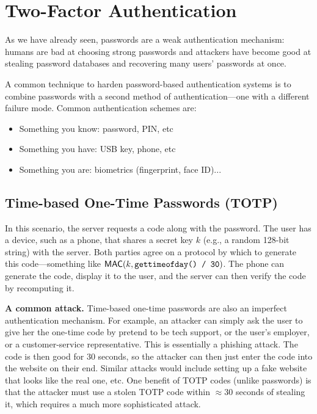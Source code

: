 \section{Two-Factor Authentication}
As we have already seen, passwords are a weak authentication
mechanism: humans are bad at choosing strong passwords and 
attackers have become good at stealing password databases
and recovering many users' passwords at once.

A common technique to harden password-based authentication systems
is to combine passwords with a second method of 
authentication---one with a different failure mode. 
Common authentication schemes are:

\begin{itemize}
	\item Something you know: password, PIN, etc
	\item Something you have: USB key, phone, etc
	\item Something you are: biometrics (fingerprint, face ID)...
\end{itemize}

\subsection{Time-based One-Time Passwords (TOTP)}
In this scenario, the server requests a code along
with the password. The user has a device, such as 
a phone, that shares a secret key $k$ (e.g., a random 128-bit string) 
with the server.
Both parties agree on a protocol by which to
generate this code---something like $\mathsf{MAC}(k, \texttt{gettimeofday() / 30})$.
The phone can generate the code, display it to the user, and the server
can then verify the code by recomputing it.

\textbf{A common attack.}
Time-based one-time passwords are also an imperfect authentication mechanism.
For example, an attacker can simply ask the user to give her the one-time code by pretend to be tech support, 
or the user's employer, or a customer-service representative.
This is essentially a phishing attack.
The code is then good for 30 seconds, so the attacker can then
just enter the code into the website on their end.
Similar attacks would include setting up a fake
website that looks like the real one, etc.
One benefit of TOTP codes (unlike passwords) is that the attacker
must use a stolen TOTP code within $\approx$30 seconds of stealing
it, which requires a much more sophisticated attack.

